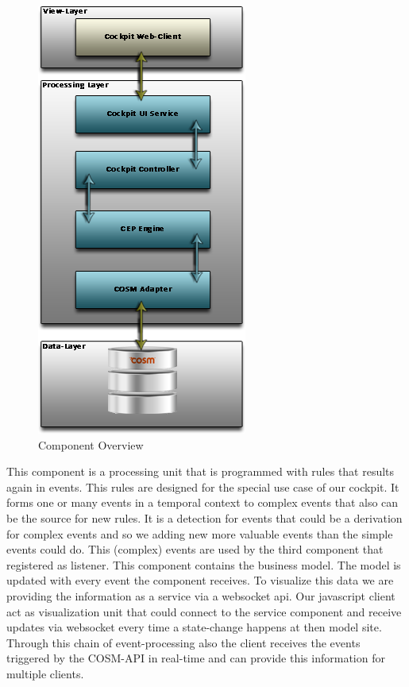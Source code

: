 \documentclass{acm_proc_article-sp}
\begin{document}
\begin{figure}[h]
	\begin{center}
		\includegraphics[scale=0.5]{Component-Overview.png}
		\caption[Component Overview]{Component Overview}
		\label{fig:AngiogeneticSwitch}
	\end{center}
\end{figure}

This component is a processing unit that is programmed with rules that results again in events. This rules are designed for the special use case of our cockpit. It forms one or many events in a temporal context to complex events that also can be the source for new rules. It is a detection for events that could be a derivation for complex events and so we adding new more valuable events than the simple events could do.
This (complex) events are used by the third component that registered as listener.
This component contains the business model. The model is updated with every event the component receives. 
To visualize this data we are providing the information as a service via a websocket api.
Our javascript client act as visualization unit that could connect to the service component and receive updates via websocket every time a state-change happens at then model site.
Through this chain of event-processing also the client receives the events triggered by the COSM-API in real-time and can provide this information for multiple clients.
\end{document}

